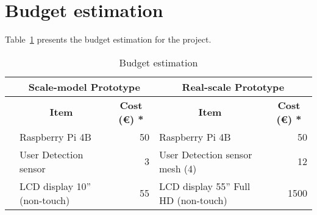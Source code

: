 %
\section{Budget estimation}
\label{sec:budget-estimation}
Table~\ref{tab:budget-estimation} presents the budget estimation for the
project.

\begingroup
\renewcommand{\arraystretch}{1.1} %
\begin{table}[!hbt]
\addtolength{\tabcolsep}{-2pt}
\footnotesize
\centering
\caption{Budget estimation}
\label{tab:budget-estimation}
\begin{tabular}{llrlr}
\hline
                                                                                                                   & \multicolumn{2}{c}{\textbf{Scale-model Prototype}}                            & \multicolumn{2}{c}{\textbf{Real-scale Prototype}}                                                       \\ \hline
                                                                                                                   & \multicolumn{1}{c}{\textbf{Item}}   & \multicolumn{1}{c}{\textbf{Cost (€) *}} & \multicolumn{1}{c}{\textbf{Item}}                             & \multicolumn{1}{c}{\textbf{Cost (€) *}} \\ \hline
\rowcolor[HTML]{FFCE93} 
\cellcolor[HTML]{FFCE93}                                                                                           & Raspberry Pi 4B                     & 50                                      & \cellcolor[HTML]{FFDBB0}Raspberry Pi 4B                       & \cellcolor[HTML]{FFDBB0}50              \\ \cline{2-5} 
\rowcolor[HTML]{FFCE93} 
\cellcolor[HTML]{FFCE93}                                                                                           & User Detection sensor               & 3                                       & \cellcolor[HTML]{FFDBB0}User Detection sensor mesh (4)        & \cellcolor[HTML]{FFDBB0}12              \\ \cline{2-5} 
\rowcolor[HTML]{FFCE93} 
\cellcolor[HTML]{FFCE93}                                                                                           & LCD display 10” (non-touch)         & 55                                      & \cellcolor[HTML]{FFDBB0}LCD display 55” Full HD (non-touch)   & \cellcolor[HTML]{FFDBB0}1500            \\ \cline{2-5} 

\end{tabular}
\end{table}

